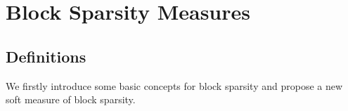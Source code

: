 \documentclass[journal,onecolumn]{IEEEtran}
\begin{document}
%





\section{Block Sparsity Measures}

\subsection{Definitions}
 We firstly introduce some basic concepts for block sparsity and propose a new soft measure of block sparsity.
\end{document}
